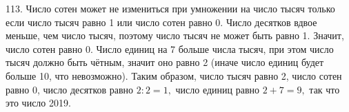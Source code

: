 113. Число сотен может не измениться при умножении на число тысяч только если число тысяч равно 1 или число сотен равно 0. Число десятков вдвое меньше, чем число тысяч, поэтому число тысяч не может быть равно 1. Значит, число сотен равно 0. Число единиц на 7 больше числа тысяч, при этом число тысяч должно быть чётным, значит оно равно 2 (иначе число единиц будет больше 10, что невозможно). Таким образом, число тысяч равно 2, число сотен равно 0, число десятков равно $2:2=1,$ число единиц равно $2+7=9,$ так что это число 2019.\\
